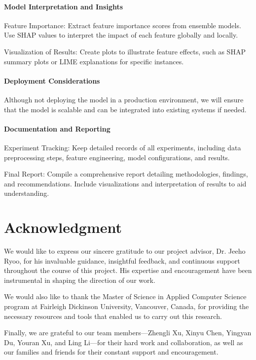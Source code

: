 \documentclass[conference]{IEEEtran}
\begin{document}
\paragraph{Model Interpretation and Insights}
\begin{description}
    \item Feature Importance: Extract feature importance scores from ensemble models. Use SHAP values to interpret the impact of each feature globally and locally. 
    \item Visualization of Results: Create plots to illustrate feature effects, such as SHAP summary plots or LIME explanations for specific instances.
\end{description}

\paragraph{Deployment Considerations}
\begin{description}
    \item Although not deploying the model in a production environment, we will ensure that the model is scalable and can be integrated into existing systems if needed. 
\end{description}

\paragraph{Documentation and Reporting}
\begin{description}
    \item Experiment Tracking: Keep detailed records of all experiments, including data preprocessing steps, feature engineering, model configurations, and results. 
    \item Final Report: Compile a comprehensive report detailing methodologies, findings, and recommendations. Include visualizations and interpretation of results to aid understanding.
\end{description}


\section*{Acknowledgment}
We would like to express our sincere gratitude to our project advisor, Dr. Jeeho Ryoo, for his invaluable guidance, insightful feedback, and continuous support throughout the course of this project. His expertise and encouragement have been instrumental in shaping the direction of our work.

We would also like to thank the Master of Science in Applied Computer Science program at Fairleigh Dickinson University, Vancouver, Canada, for providing the necessary resources and tools that enabled us to carry out this research.

Finally, we are grateful to our team members—Zhengli Xu, Xinyu Chen, Yingyan Du, Youran Xu, and Ling Li—for their hard work and collaboration, as well as our families and friends for their constant support and encouragement.


%


\end{document}
